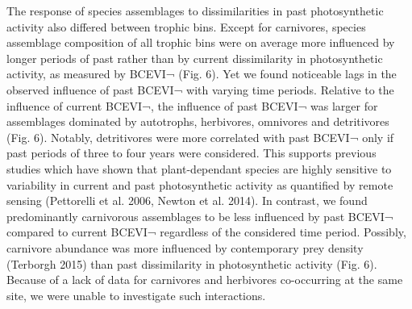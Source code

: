 {	The response of species assemblages to dissimilarities in past photosynthetic activity also differed between trophic bins. Except for carnivores, species assemblage composition of all trophic bins were on average more influenced by longer periods of past rather than by current dissimilarity in photosynthetic activity, as measured by BCEVI¬ (Fig. 6). Yet we found noticeable lags in the observed influence of past BCEVI¬ with varying time periods. Relative to the influence of current BCEVI¬, the influence of past BCEVI¬ was larger for assemblages dominated by autotrophs, herbivores, omnivores and detritivores (Fig. 6). Notably, detritivores were more correlated with past BCEVI¬ only if past periods of three to four years were considered. This supports previous studies which have shown that plant-dependant species are highly sensitive to variability in current and past photosynthetic activity as quantified by remote sensing (Pettorelli et al. 2006, Newton et al. 2014). In contrast, we found predominantly carnivorous assemblages to be less influenced by past BCEVI¬ compared to current BCEVI¬ regardless of the considered time period. Possibly, carnivore abundance was more influenced by contemporary prey density (Terborgh 2015) than past dissimilarity in photosynthetic activity (Fig. 6). Because of a lack of data for carnivores and herbivores co-occurring at the same site, we were unable to investigate such interactions. 

}
